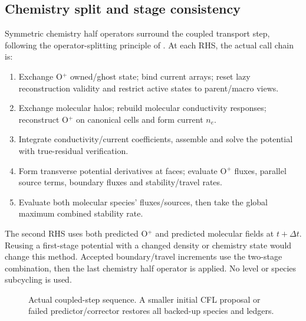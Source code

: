 \subsection{Chemistry split and stage consistency}
Symmetric chemistry half operators surround the coupled transport step,
following the operator-splitting principle of \citet{Strang}. At each RHS,
the actual call chain is:
\begin{enumerate}
\item Exchange O$^+$ owned/ghost state; bind current arrays; reset lazy
  reconstruction validity and restrict active states to parent/macro views.
\item Exchange molecular halos; rebuild molecular conductivity responses;
  reconstruct O$^+$ on canonical cells and form current $n_e$.
\item Integrate conductivity/current coefficients, assemble and solve the
  potential with true-residual verification.
\item Form transverse potential derivatives at faces; evaluate O$^+$ fluxes,
  parallel source terms, boundary fluxes and stability/travel rates.
\item Evaluate both molecular species' fluxes/sources, then take the global
  maximum combined stability rate.
\end{enumerate}
The second RHS uses both predicted O$^+$ and predicted molecular fields at
$t+\Delta t$. Reusing a first-stage potential with a changed density or
chemistry state would change this method. Accepted boundary/travel
increments use the two-stage combination, then the last chemistry half
operator is applied. No level or species subcycling is used.

\begin{figure}[ht]
\centering
{}
\caption{Actual coupled-step sequence. A smaller initial CFL proposal or failed
predictor/corrector restores all backed-up species and ledgers.}
\end{figure}


